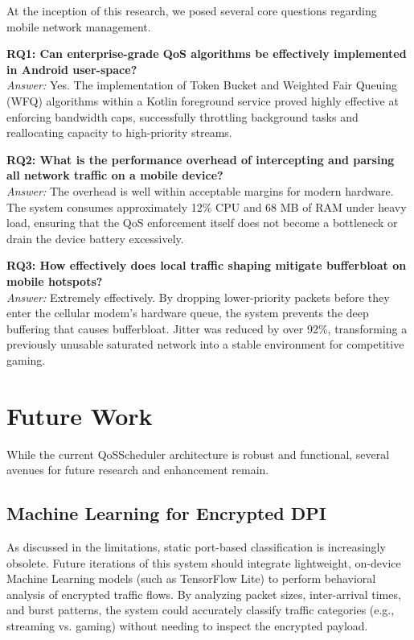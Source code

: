 At the inception of this research, we posed several core questions regarding mobile network management.

\textbf{RQ1: Can enterprise-grade QoS algorithms be effectively implemented in Android user-space?} \\
\textit{Answer:} Yes. The implementation of Token Bucket and Weighted Fair Queuing (WFQ) algorithms within a Kotlin foreground service proved highly effective at enforcing bandwidth caps, successfully throttling background tasks and reallocating capacity to high-priority streams.

\textbf{RQ2: What is the performance overhead of intercepting and parsing all network traffic on a mobile device?} \\
\textit{Answer:} The overhead is well within acceptable margins for modern hardware. The system consumes approximately 12\% CPU and 68 MB of RAM under heavy load, ensuring that the QoS enforcement itself does not become a bottleneck or drain the device battery excessively.

\textbf{RQ3: How effectively does local traffic shaping mitigate bufferbloat on mobile hotspots?} \\
\textit{Answer:} Extremely effectively. By dropping lower-priority packets before they enter the cellular modem's hardware queue, the system prevents the deep buffering that causes bufferbloat. Jitter was reduced by over 92\%, transforming a previously unusable saturated network into a stable environment for competitive gaming.

\section{Future Work}
\label{sec:future_work}

While the current QoSScheduler architecture is robust and functional, several avenues for future research and enhancement remain.

\subsection{Machine Learning for Encrypted DPI}
As discussed in the limitations, static port-based classification is increasingly obsolete. Future iterations of this system should integrate lightweight, on-device Machine Learning models (such as TensorFlow Lite) to perform behavioral analysis of encrypted traffic flows. By analyzing packet sizes, inter-arrival times, and burst patterns, the system could accurately classify traffic categories (e.g., streaming vs. gaming) without needing to inspect the encrypted payload.

